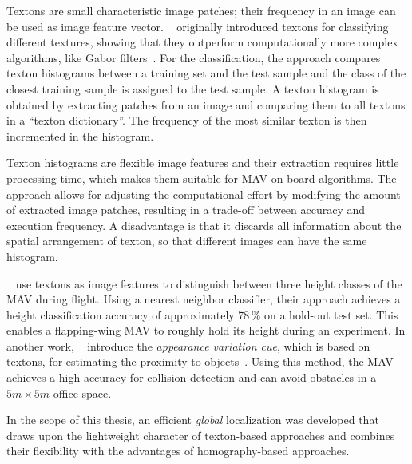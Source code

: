 \documentclass[11pt]{report}
\begin{document}
Textons are small characteristic image patches; their frequency in an
image can be used as image feature
vector. \citeauthor{varma2005statistical}~\cite{varma2005statistical}
originally introduced textons for classifying different textures,
showing that they outperform computationally more complex algorithms,
like Gabor filters~\cite{varma2005statistical}. For the
classification, the approach compares texton histograms between a
training set and the test sample and the class of the closest training
sample is assigned to the test
sample. %
A texton histogram is obtained by extracting patches from an image and
comparing them to all textons in a ``texton dictionary''. The
frequency of the most similar texton is then incremented in the
histogram.

Texton histograms are flexible image features and their extraction
requires little processing time, which makes them suitable for MAV
on-board algorithms. The approach allows for adjusting the
computational effort by modifying the amount of extracted image
patches, resulting in a trade-off between accuracy and execution
frequency.  A disadvantage is that it discards all information about the spatial
arrangement of texton, %
so that different images can have the same histogram.

\citeauthor{de2009design}~\cite{de2009design} use textons
as image features to distinguish between three height classes of the
MAV during flight. Using a nearest neighbor classifier, their approach
achieves a height classification accuracy of approximately 78\,\% on a
hold-out test set. This enables a flapping-wing MAV to roughly hold
its height during an experiment. In another work,
\citeauthor{de2012appearance}~\cite{de2012appearance} introduce the
\emph{appearance variation cue}, which is based on textons, for
estimating the proximity to objects~\cite{de2012appearance}.
Using this method, the MAV achieves a high accuracy for collision
detection and can avoid obstacles in a $5m \times 5m$ office space.

In the scope of this thesis, an efficient \emph{global} localization
was developed that draws upon the lightweight character of
texton-based approaches and combines their flexibility with the
advantages of homography-based approaches.
\end{document}
